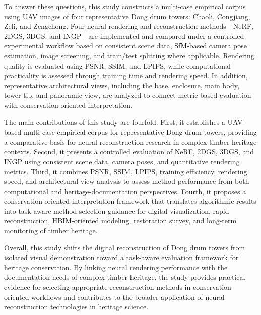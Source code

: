 To answer these questions, this study constructs a multi-case empirical
corpus using UAV images of four representative Dong drum towers: Chaoli,
Congjiang, Zeli, and Zengchong. Four neural rendering and reconstruction
methods---NeRF, 2DGS, 3DGS, and INGP---are implemented and compared
under a controlled experimental workflow based on consistent scene data,
SfM-based camera pose estimation, image screening, and train/test
splitting where applicable. Rendering quality is evaluated using PSNR,
SSIM, and LPIPS, while computational practicality is assessed through
training time and rendering speed. In addition, representative
architectural views, including the base, enclosure, main body, tower
tip, and panoramic view, are analyzed to connect metric-based evaluation
with conservation-oriented interpretation.

The main contributions of this study are fourfold. First, it establishes
a UAV-based multi-case empirical corpus for representative Dong drum
towers, providing a comparative basis for neural reconstruction research
in complex timber heritage contexts. Second, it presents a controlled
evaluation of NeRF, 2DGS, 3DGS, and INGP using consistent scene data,
camera poses, and quantitative rendering metrics. Third, it combines
PSNR, SSIM, LPIPS, training efficiency, rendering speed, and
architectural-view analysis to assess method performance from both
computational and heritage-documentation perspectives. Fourth, it
proposes a conservation-oriented interpretation framework that
translates algorithmic results into task-aware method-selection guidance
for digital visualization, rapid reconstruction, HBIM-oriented modeling,
restoration survey, and long-term monitoring of timber heritage.

Overall, this study shifts the digital reconstruction of Dong drum
towers from isolated visual demonstration toward a task-aware evaluation
framework for heritage conservation. By linking neural rendering
performance with the documentation needs of complex timber heritage, the
study provides practical evidence for selecting appropriate
reconstruction methods in conservation-oriented workflows and
contributes to the broader application of neural reconstruction
technologies in heritage science.


